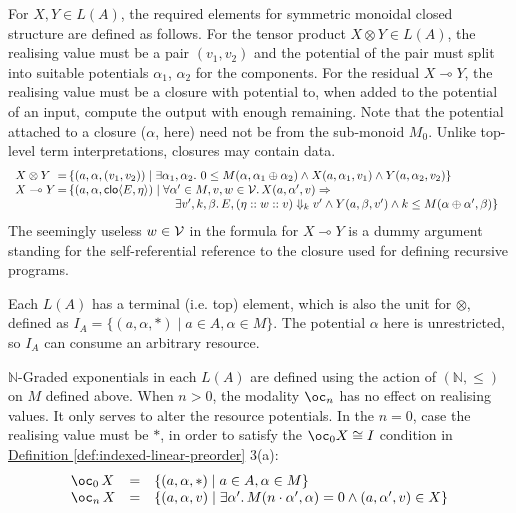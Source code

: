 \documentclass[acmsmall,screen]{acmart}
\newcommand{\defref}[1]{\hyperref[#1]{Definition \ref*{#1}}}
\begin{document}
For $X, Y \in L(A)$, the required elements for symmetric monoidal
closed structure are defined as follows. For the tensor product
$X \otimes Y \in L(A)$, the realising value must be a pair $(v_1,v_2)$
and the potential of the pair must split into suitable potentials
$\alpha_1$, $\alpha_2$ for the components. For the residual
$X \multimap Y$, the realising value must be a closure with potential
to, when added to the potential of an input, compute the output with
enough remaining. Note that the potential attached to a closure
($\alpha$, here) need not be from the sub-monoid $M_0$. Unlike
top-level term interpretations, closures may contain data.
\begin{displaymath}
  \begin{array}{l@{\,}c@{\,}l}
    X \otimes Y &=& \{ (a, \alpha, (v_1, v_2)) \mid \exists \alpha_1, \alpha_2.~0 \leq M(\alpha, \alpha_1 \rplus \alpha_2) \land X(a,\alpha_1,v_1) \land Y(a,\alpha_2,v_2) \}\\
    X \multimap Y &=& \{ (a, \alpha, \clo{E}{\eta}) \mid
                      \begin{array}[t]{@{}l}
                        \forall \alpha' \in M, v,w \in \ValSet.\,X(a,\alpha',v) \Rightarrow\\
                        \quad \exists v', k, \beta.\,
                        E, (\eta :: w :: v) \Downarrow_k v' \land Y(a,\beta,v') \land k \leq M(\alpha \rplus \alpha', \beta) \} \end{array}
  \end{array}
\end{displaymath}
The seemingly useless $w \in \mathcal{V}$ in the formula for
$X \multimap Y$ is a dummy argument standing for the self-referential
reference to the closure used for defining recursive programs.

Each $L(A)$ has a terminal (i.e. top) element, which is also the unit
for $\otimes$, defined as
$I_A = \{(a, \alpha, *) \mid a \in A, \alpha \in M\}$. The potential
$\alpha$ here is unrestricted, so $I_A$ can consume an arbitrary
resource.

$\mathbb{N}$-Graded exponentials in each $L(A)$ are defined using the
action of $(\mathbb{N}, \leq)$ on $M$ defined above. When $n > 0$, the
modality $\oc_n$ has no effect on realising values. It only serves to
alter the resource potentials. In the $n = 0$, case the realising
value must be $*$, in order to satisfy the $\oc_0 X \cong I$ condition
in \defref{def:indexed-linear-preorder} 3(a):
\begin{displaymath}
  \begin{array}{lcl}
    \oc_0\,X&=&\{(a, \alpha, *) \mid a \in A, \alpha \in M \} \\
    \oc_n\,X&=&\{(a,\alpha,v) \mid \exists \alpha'.\,M(n \cdot \alpha', \alpha) = 0 \land (a, \alpha', v) \in X \}
  \end{array}
\end{displaymath}
\end{document}
